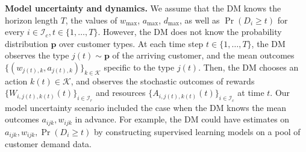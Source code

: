 \documentclass[letterpaper, 10 pt, conference]{ieeeconf}  %
\newcommand{\III}{\mathcal{I}}
\newcommand{\KKK}{\mathcal{K}}
\theoremstyle{plain}
\theoremstyle{definition}
\theoremstyle{remark}
\begin{document}
\textbf{Model uncertainty and dynamics.} We assume that the DM knows the horizon length $T$, the values of $w_{\max}$, $a_{\max}$, $d_{\max}$, as well as $\Pr( D_i \geq t)$ for every $i \in \III_c, t \in \{1, \ldots, T\}$. However, the DM does not know the probability distribution  $\mathbf{p}$ over customer types. At each time step $t\in \{1, \ldots, T\}$, the DM observes the type $j(t)\sim \mathbf{p}$ of the arriving customer, and the mean outcomes $\{(w_{j(t), k}, a_{j(t), k})\}_{k\in \KKK}$ specific to the type $j(t)$. Then, the DM chooses an action $k(t)\in \KKK$, and observes the stochastic outcomes of rewards $\{W_{i, j(t), k(t)}(t)\}_{i \in \III_r}$ and resources $\{A_{i, j(t), k(t)}(t)\}_{i \in \III_c}$ at time $t$. Our model uncertainty scenario included the case when the DM knows the mean outcomes $a_{ijk},w_{ijk}$ in advance. For example, the DM could have estimates on $a_{ijk}, w_{ijk}, \Pr( D_i \geq t)$ by constructing supervised learning models \cite{chen2022statistical, han2020neural, aouad2022representing} on a pool of customer demand data.  
\end{document}
